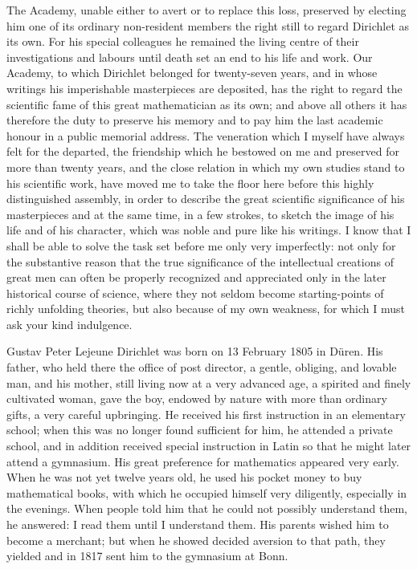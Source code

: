 \documentclass[11pt]{article}
\begin{document}
The Academy, unable either to avert or to replace this loss, preserved by electing him one of its ordinary non-resident members the right still to regard Dirichlet as its own. For his special colleagues he remained the living centre of their investigations and labours until death set an end to his life and work. Our Academy, to which Dirichlet belonged for twenty-seven years, and in whose writings his imperishable masterpieces are deposited, has the right to regard the scientific fame of this great mathematician as its own; and above all others it has therefore the duty to preserve his memory and to pay him the last academic honour in a public memorial address. The veneration which I myself have always felt for the departed, the friendship which he bestowed on me and preserved for more than twenty years, and the close relation in which my own studies stand to his scientific work, have moved me to take the floor here before this highly distinguished assembly, in order to describe the great scientific significance of his masterpieces and at the same time, in a few strokes, to sketch the image of his life and of his character, which was noble and pure like his writings. I know that I shall be able to solve the task set before me only very imperfectly: not only for the substantive reason that the true significance of the intellectual creations of great men can often be properly recognized and appreciated only in the later historical course of science, where they not seldom become starting-points of richly unfolding theories, but also because of my own weakness, for which I must ask your kind indulgence.

Gustav Peter Lejeune Dirichlet was born on 13 February 1805 in Düren. His father, who held there the office of post director, a gentle, obliging, and lovable man, and his mother, still living now at a very advanced age, a spirited and finely cultivated woman, gave the boy, endowed by nature with more than ordinary gifts, a very careful upbringing. He received his first instruction in an elementary school; when this was no longer found sufficient for him, he attended a private school, and in addition received special instruction in Latin so that he might later attend a gymnasium. His great preference for mathematics appeared very early. When he was not yet twelve years old, he used his pocket money to buy mathematical books, with which he occupied himself very diligently, especially in the evenings. When people told him that he could not possibly understand them, he answered: I read them until I understand them. His parents wished him to become a merchant; but when he showed decided aversion to that path, they yielded and in 1817 sent him to the gymnasium at Bonn.
\end{document}
